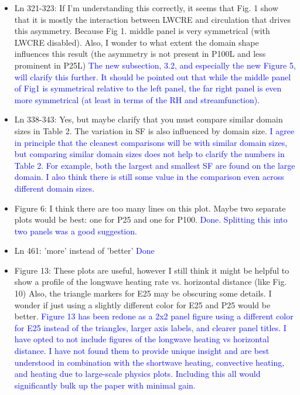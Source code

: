 \documentclass[draft]{agujournal2019}
\begin{document}
\begin{itemize}
  \item Ln 321-323:   If I'm understanding this correctly, it seems that Fig. 1 show that it is mostly the interaction between LWCRE and 
  circulation that drives this asymmetry. Because Fig 1. middle panel is very symmetrical (with LWCRE disabled).
Also, I wonder to what extent the domain shape influences 
  this result (the asymmetry is not present in P100L and less prominent in P25L)
  \textcolor{blue}{The new subsection, 3.2, and especially the new Figure 5, will clarify this further.  It should be pointed out that while the middle panel of Fig1 is symmetrical relative to the left panel, 
  the far right panel is even more symmetrical (at least in terms of the RH and streamfunction).}
  
  \item Ln 338-343: Yes, but maybe clarify that you must compare similar domain sizes in Table 2. The variation in SF is also influenced by domain size. 
  \textcolor{blue}{I agree in principle that the cleanest comparisons will be with similar domain sizes, but comparing similar domain sizes does not help to clarify the numbers in Table 2.  For example, both the largest and smallest SF are found on the large domain.  I also think there is still some value 
  in the comparison even across different domain sizes.}
  
  \item Figure 6: I think there are too many lines on this plot. Maybe two separate plots would be best: one for P25 and one for P100.
  \textcolor{blue}{Done.  Splitting this into two panels was a good suggestion.}
  
  \item Ln 461: 'more' instead of 'better'
  \textcolor{blue}{Done}
  
  \item Figure 13: These plots are useful, however I still think it might be helpful to show a profile of the longwave heating rate vs. horizontal distance (like Fig. 10)
%
Also, the triangle markers for E25 may be obscuring some details. 
I wonder if just using a slightly different color for E25 and P25 would be better.
\textcolor{blue}{Figure 13 has been redone as a 2x2 panel figure using a different color for E25 instead of the triangles, larger axis labels, and clearer panel 
titles.  I have opted to not include figures of the longwave heating vs horizontal distance.  I have not found them to provide unique insight and are best 
understood in combination with the shortwave heating, convective heating, and heating due to large-scale physics plots.  Including this all would significantly 
bulk up the paper with minimal gain.}
  

\end{itemize}
\end{document}
